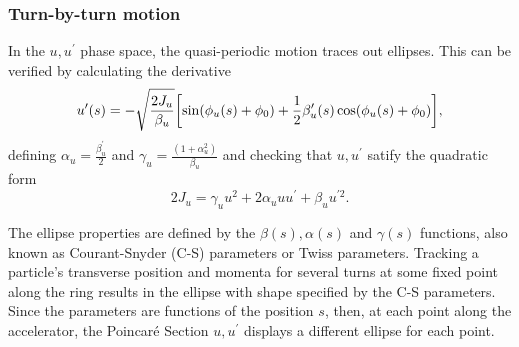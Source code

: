 \subsubsection{Turn-by-turn motion}
In the $u, u^\prime$ phase space, the quasi-periodic motion traces out ellipses. This can be verified by calculating the derivative
    \begin{equation}
        u^{\prime}(s) = - \sqrt{\frac{2J_u}{\beta_u}}\qty[\sin(\phi_u(s) + \phi_0) + \frac{1}{2}\beta_u^\prime(s)\cos(\phi_u(s) + \phi_0)],
        \label{eq:uprime}
    \end{equation}
    defining $\alpha_u = \frac{\beta_u^\prime}{2}$  and $\gamma_u = \frac{(1+\alpha_u^2)}{\beta_u}$ and checking that $u, u^\prime$ satify the quadratic form
    \begin{equation}
        2J_u=\gamma_u u^{2}+2\alpha_u u u^{\prime}+\beta_u u^{\prime2}.
     \end{equation}

The ellipse properties are defined by the $\beta(s), \alpha(s)$ and $\gamma(s)$ functions, also known as Courant-Snyder (C-S) parameters or Twiss parameters. Tracking a particle's transverse position and momenta for several turns at some fixed point along the ring results in the ellipse with shape specified by the C-S parameters. Since the parameters are functions of the position $s$, then, at each point along the accelerator, the Poincaré Section $u, u^\prime$ displays a different ellipse for each point.

